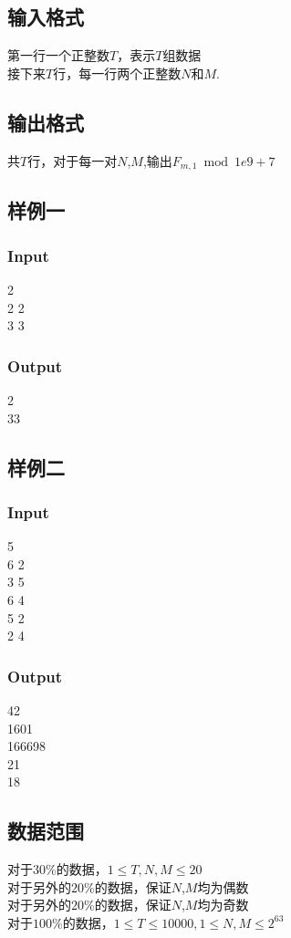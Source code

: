 \documentclass{article}
\begin{document}
\begin{spacing}{1.0}
\subsection{输入格式}
第一行一个正整数$T$，表示$T$组数据\\
接下来$T$行，每一行两个正整数$N$和$M$.\\
\subsection{输出格式}
共$T$行，对于每一对$N$,$M$,输出$F_{m,1}\bmod 1e9+7$ \\
\subsection{样例一}
\subsubsection{Input}
2\\
2 2\\
3 3\\
\subsubsection{Output}
2\\
33\\
\subsection{样例二}
\subsubsection{Input}
5\\
6 2\\
3 5\\
6 4\\
5 2\\
2 4\\
\subsubsection{Output}
42\\
1601\\
166698\\
21\\
18\\
\subsection{数据范围}
对于$30\%$的数据，$1\leq T,N,M\leq 20$\\
对于另外的$20\%$的数据，保证$N$,$M$均为偶数\\
对于另外的$20\%$的数据，保证$N$,$M$均为奇数\\
对于$100\%$的数据，$1\leq T\leq 10000,1\leq N,M\leq 2^{63}$\\
\newpage

\end{spacing}
\end{document}
